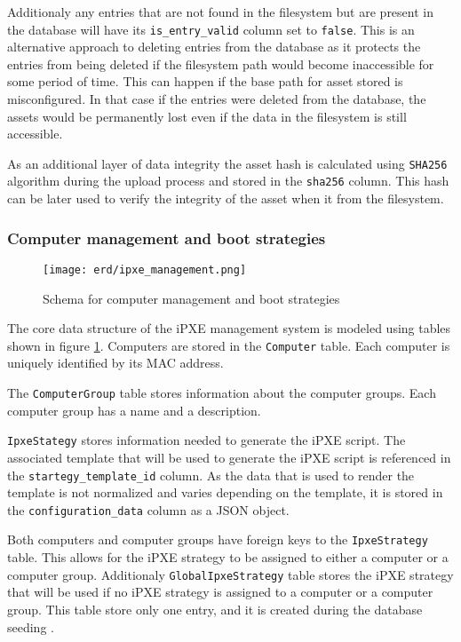 \documentclass[../main.tex]{subfiles}
\begin{document}
Additionaly any entries that are not found in the filesystem but are present in the database will have its \texttt{is\_entry\_valid} column set to \texttt{false}.
This is an alternative approach to deleting entries from the database as it protects the entries from being deleted if the filesystem path would become inaccessible for some period of time.
This can happen if the base path for asset stored is misconfigured. In that case if the entries were deleted from the database, the assets would be permanently lost even if the data in the filesystem is still accessible.

As an additional layer of data integrity the asset hash is calculated using \texttt{SHA256} \cite{sha256} algorithm during the upload process and stored in the \texttt{sha256} column.
This hash can be later used to verify the integrity of the asset when it from the filesystem.

\subsubsection{Computer management and boot strategies}

\begin{figure}[H]
  \centering
  \texttt{[image: erd/ipxe\_management.png]}
  \caption{Schema for computer management and boot strategies}
  \label{fig:erd_ipxe_management}
\end{figure}

The core data structure of the iPXE management system is modeled using tables shown in figure \ref{fig:erd_ipxe_management}.
Computers are stored in the \texttt{Computer} table. Each computer is uniquely identified by its MAC address.

The \texttt{ComputerGroup} table stores information about the computer groups. Each computer group has a name and a description.

\texttt{IpxeStategy} stores information needed to generate the iPXE script.
The associated template that will be used to generate the iPXE script is referenced in the \texttt{startegy\_template\_id} column.
As the data that is used to render the template is not normalized and varies depending on the template, it is stored in the \texttt{configuration\_data} column as a JSON object.

Both computers and computer groups have foreign keys to the \texttt{IpxeStrategy} table. This allows for the iPXE strategy to be assigned to either a computer or a computer group.
Additionaly \texttt{GlobalIpxeStrategy} table stores the iPXE strategy that will be used if no iPXE strategy is assigned to a computer or a computer group.
This table store only one entry, and it is created during the database seeding \cite{prisma-seeding}.
\end{document}
